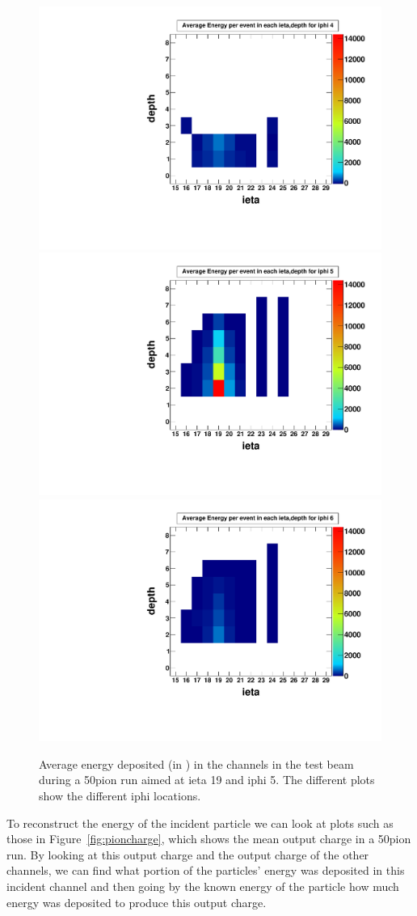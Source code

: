 \begin{figure}
\centering
\includegraphics[width=0.495\linewidth]{Figures/pionrun1.pdf}
\includegraphics[width=0.495\linewidth]{Figures/pionrun.pdf}
\includegraphics[width=0.495\linewidth]{Figures/pionrun2.pdf}
\caption{Average energy deposited (in \MeV) in the channels in the test beam during a 50\GeV\space pion run aimed at ieta 19 and iphi 5. The different plots show the different iphi locations.}
\label{fig:pionmap}
\end{figure}

To reconstruct the energy of the incident particle we can look at plots such as those in Figure~\ref{fig:pioncharge}, which shows the mean output charge in a 50\GeV\space pion run. By looking at this output charge and the output charge of the other channels, we can find what portion of the particles' energy was deposited in this incident channel and then going by the known energy of the particle how much energy was deposited to produce this output charge. 

